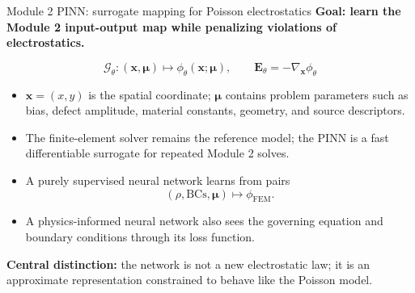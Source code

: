\documentclass[aspectratio=169,10pt]{beamer}
\begin{document}
\begin{frame}{Module 2 PINN: surrogate mapping for Poisson electrostatics}
\small
\textbf{Goal: learn the Module 2 input-output map while penalizing violations of electrostatics.}

\vspace{0.25em}
\begin{equation*}
\boxed{
\mathcal G_{\theta}:
\left(\mathbf x,\boldsymbol\mu\right)
\longmapsto
\phi_{\theta}(\mathbf x;\boldsymbol\mu),
\qquad
\mathbf E_{\theta}=-\nabla_{\mathbf x}\phi_{\theta}
}
\end{equation*}

\vspace{-0.15em}
\begin{itemize}
    \item $\mathbf x=(x,y)$ is the spatial coordinate; $\boldsymbol\mu$ contains problem parameters such as bias, defect amplitude, material constants, geometry, and source descriptors.
    \item The finite-element solver remains the reference model; the PINN is a fast differentiable surrogate for repeated Module 2 solves.
    \item A purely supervised neural network learns from pairs
    \[
        \left(\rho,\text{BCs},\boldsymbol\mu\right)\mapsto \phi_{\mathrm{FEM}}.
    \]
    \item A physics-informed neural network also sees the governing equation and boundary conditions through its loss function.
\end{itemize}

\vspace{0.15em}
\textbf{Central distinction:} the network is not a new electrostatic law; it is an approximate representation constrained to behave like the Poisson model.
\end{frame}
\end{document}
